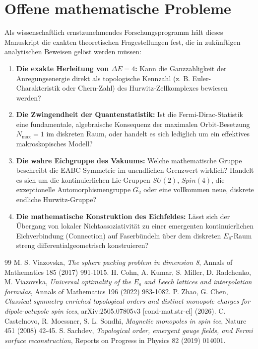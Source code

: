 \documentclass[11pt,a4paper]{article}
\begin{document}
\section{Offene mathematische Probleme}
Als wissenschaftlich ernstzunehmendes Forschungsprogramm hält dieses Manuskript die exakten theoretischen Fragestellungen fest, die in zukünftigen analytischen Beweisen gelöst werden müssen:
\begin{enumerate}
	\item \textbf{Die exakte Herleitung von $\Delta E = 4$:} Kann die Ganzzahligkeit der Anregungsenergie direkt als topologische Kennzahl (z. B. Euler-Charakteristik oder Chern-Zahl) des Hurwitz-Zellkomplexes bewiesen werden?
	\item \textbf{Die Zwingendheit der Quantenstatistik:} Ist die Fermi-Dirac-Statistik eine fundamentale, algebraische Konsequenz der maximalen Orbit-Besetzung $N_{\max} = 1$ im diskreten Raum, oder handelt es sich lediglich um ein effektives makroskopisches Modell?
	\item \textbf{Die wahre Eichgruppe des Vakuums:} Welche mathematische Gruppe beschreibt die EABC-Symmetrie im unendlichen Grenzwert wirklich? Handelt es sich um die kontinuierlichen Lie-Gruppen $SU(2)$, $Spin(4)$, die exzeptionelle Automorphismengruppe $G_2$ oder eine vollkommen neue, diskrete endliche Hurwitz-Gruppe?
	\item \textbf{Die mathematische Konstruktion des Eichfeldes:} Lässt sich der Übergang von lokaler Nichtassoziativität zu einer emergenten kontinuierlichen Eichverbindung (Connection) auf Faserbündeln über dem diskreten $E_8$-Raum streng differentialgeometrisch konstruieren?
\end{enumerate}

\begin{thebibliography}{99}
	 M. S. Viazovska, \textit{The sphere packing problem in dimension 8}, Annals of Mathematics 185 (2017) 991-1015.
	 H. Cohn, A. Kumar, S. Miller, D. Radchenko, M. Viazovska, \textit{Universal optimality of the $E_8$ and Leech lattices and interpolation formulas}, Annals of Mathematics 196 (2022) 983-1082.
	 P. Zhao, G. Chen, \textit{Classical symmetry enriched topological orders and distinct monopole charges for dipole-octupole spin ices}, arXiv:2505.07805v3 [cond-mat.str-el] (2026).
	 C. Castelnovo, R. Moessner, S. L. Sondhi, \textit{Magnetic monopoles in spin ice}, Nature 451 (2008) 42-45.
	 S. Sachdev, \textit{Topological order, emergent gauge fields, and Fermi surface reconstruction}, Reports on Progress in Physics 82 (2019) 014001.
\end{thebibliography}
\end{document}
